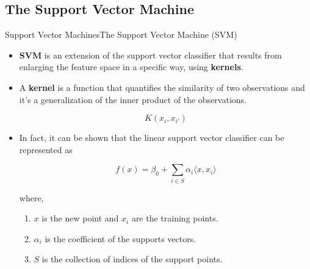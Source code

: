 \subsection{The Support Vector Machine}
\begin{frame}{Support Vector Machines}{The Support Vector Machine (SVM)}

\begin{itemize}
    \item \textbf{SVM} is an extension of the support vector classifier that results from enlarging the feature space in a specific way, using \textbf{kernels}. \pause 

    \item A \textbf{kernel} is a function that quantifies the similarity of two observations and it's a generalization of the inner product of the observations.  \pause 

    \begin{equation*}
        K(x_i, x_{i'})
    \end{equation*} \pause 

    \item In fact, it can be shown that the linear support vector classifier can be represented as \pause 

    \begin{equation}\label{eq:linear-svc}
        f(x) = \beta_0 + \sum_{i \in S} \alpha_i \langle x,x_i \rangle
    \end{equation} \pause 

    where, \pause 
    \begin{enumerate}
        \item $x$ is the new point and $x_i$ are the training points. \pause 
        \item $\alpha_i$ is the coefficient of the supports vectors. 
        \item $S$ is the collection of indices of the support points. 
    \end{enumerate}

    
\end{itemize}

    
\end{frame}


